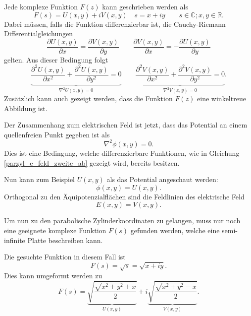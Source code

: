 Jede komplexe Funktion $F(z)$ kann geschrieben werden als
\begin{equation}
	F(s) = U(x,y) + iV(x,y) \quad s = x + iy \qquad s \in \mathbb{C}; x,y \in \mathbb{R}.
\end{equation}  
Dabei müssen, falls die Funktion differenzierbar ist, die Cauchy-Riemann Differentialgleichungen 
\begin{equation}
	\frac{\partial U(x,y)}{\partial x} 
	=
	\frac{\partial V(x,y)}{\partial y} 
	\qquad
	\frac{\partial V(x,y)}{\partial x}
	=
	-\frac{\partial U(x,y)}{\partial y}
\end{equation}
gelten.
Aus dieser Bedingung folgt 
\begin{equation}
	\label{parzyl_e_feld_zweite_ab}
	\underbrace{
		\frac{\partial^2 U(x,y)}{\partial x^2}
		+ 
		\frac{\partial^2 U(x,y)}{\partial y^2}
		=
		0
	}_{\displaystyle{\nabla^2U(x,y)=0}}
	\qquad
	\underbrace{
		\frac{\partial^2 V(x,y)}{\partial x^2}
		+
		\frac{\partial^2 V(x,y)}{\partial y^2}
		=
		0
	}_{\displaystyle{\nabla^2V(x,y) = 0}}.
\end{equation}
Zusätzlich kann auch gezeigt werden, dass die Funktion $F(z)$ eine winkeltreue Abbildung ist.


Der Zusammenhang zum elektrischen Feld ist jetzt, dass das Potential an einem quellenfreien Punkt gegeben ist als 
\begin{equation}
	\nabla^2\phi(x,y) = 0.
\end{equation}
Dies ist eine Bedingung, welche differenzierbare Funktionen, wie in Gleichung \eqref{parzyl_e_feld_zweite_ab} gezeigt wird, bereits besitzen. 


Nun kann zum Beispiel $U(x,y)$ als das Potential angeschaut werden:
\begin{equation}
	\phi(x,y) = U(x,y).
\end{equation}
Orthogonal zu den Äquipotenzialflächen sind die Feldlinien des elektrische Feld
\begin{equation}
	E(x,y) = V(x,y).
\end{equation}


Um nun zu den parabolische Zylinderkoordinaten zu gelangen, muss nur noch eine geeignete 
komplexe Funktion $F(s)$ gefunden werden, 
welche eine semi-infinite Platte beschreiben kann.


Die gesuchte Funktion in diesem Fall ist
\begin{equation}
	F(s) 
	= 
	\sqrt{s} 
	= 
	\sqrt{x + iy}.
\end{equation}
Dies kann umgeformt werden zu
\begin{equation}
	F(s) 
	= 
	\underbrace{\sqrt{\frac{\sqrt{x^2+y^2} + x}{2}}}_{\displaystyle{U(x,y)}} 
	+ 
	i\underbrace{\sqrt{\frac{\sqrt{x^2+y^2} - x}{2}}}_{\displaystyle{V(x,y)}}
	.
\end{equation}


